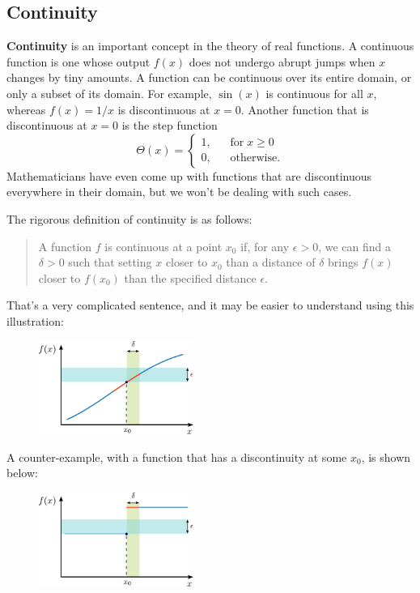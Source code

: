 \documentclass[10pt,a4paper]{article}
\begin{document}
\subsection{Continuity}

\textbf{Continuity} is an important concept in the theory of real
functions. A continuous function is one whose output $f(x)$ does not
undergo abrupt jumps when $x$ changes by tiny amounts. A function can
be continuous over its entire domain, or only a subset of its domain.
For example, $\sin(x)$ is continuous for all $x$, whereas
$f(x) = 1/x$ is discontinuous at $x = 0$. Another function that is
discontinuous at $x=0$ is the step function
\begin{equation}
  \Theta(x) = \left\{\begin{array}{ll} 1, &\;\;\;\textrm{for} \; x \ge 0\\ 0,&\;\;\; \textrm{otherwise.}\end{array}\right.
\end{equation}
Mathematicians have even come up with functions that are discontinuous
everywhere in their domain, but we won't be dealing with such cases.

The rigorous definition of continuity is as follows:

\begin{quote}
A function $f$ is continuous at a point $x_0$ if, for any
$\epsilon > 0$, we can find a $\delta > 0$ such that setting $x$
closer to $x_0$ than a distance of $\delta$ brings $f(x)$ closer
to $f(x_0)$ than the specified distance $\epsilon$.
\end{quote}

\noindent
That's a very complicated sentence, and it may be easier to understand
using this illustration:

\begin{figure}[ht]
  \centering\includegraphics[width=0.45\textwidth]{continuity}
\end{figure}

\noindent
A counter-example, with a function that has a discontinuity at some
$x_0$, is shown below:

\begin{figure}[ht]
  \centering\includegraphics[width=0.45\textwidth]{discontinuity}
\end{figure}
\end{document}

